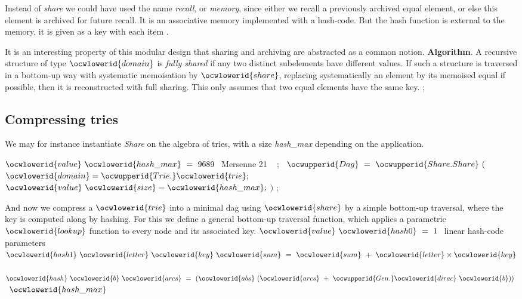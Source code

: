 \documentclass[12pt]{article}
\begin{document}
\ocwendcode{}\ocwindent{0.00em}
Instead of {\sl share} we could have used the name {\sl recall}, 
or {\sl memory}, since either we recall
a previously archived equal element, or else this element is archived for
future recall. It is an associative memory implemented with a hash-code. 
But the hash function is external to the memory, it is given as a key with 
each item . 

It is an interesting property of this modular design that
sharing and archiving are abstracted as a common notion. 
\ocweol
\ocwindent{0.00em}
{\bf Algorithm}.
   A recursive structure of type \ocwbegindcode{}$\ocwlowerid{domain}$\ocwenddcode{} is {\sl fully shared} if any two 
   distinct subelements have different values.
   If such a structure is traversed in a bottom-up way with systematic 
   memoisation by \ocwbegindcode{}$\ocwlowerid{share}$\ocwenddcode{}, replacing systematically an element by its memoised 
   equal if possible, then it is reconstructed with full sharing.
   This only assumes that two equal elements have the same key. 
\ocweol
\label{../ML/share.ml:4285}%
\medskip
\ocwbegincode{}\ocwindent{0.00em}
\ocweol
\ocwindent{0.00em}
;\ocweol
\ocweol
\ocwendcode{}\subsection{Compressing tries}

We may for instance instantiate {\sl Share} on the algebra of tries, with
a size {\sl hash\_max} depending on the application.


\label{../ML/mini.ml:0}%
\label{../ML/mini.ml:724}%
\ocwbegincode{}\ocwindent{0.00em}
$\ocwlowerid{value}~\ocwlowerid{hash\_max}~=~9689~$\ocwbc{} Mersenne 21 \ocwec{}~\ocweol
\ocwindent{0.00em}
;\ocweol
\ocwindent{0.00em}
~$\ocwupperid{Dag}~=~\ocwupperid{Share.Share}~($~~$\ocwlowerid{domain}=\ocwupperid{Trie.}\ocwlowerid{trie};~$\ocweol
\ocwindent{16.50em}
$\ocwlowerid{value}~\ocwlowerid{size}=\ocwlowerid{hash\_max};~$$)$\ocweol
\ocwindent{0.00em}
;\medskip

\ocwendcode{}\ocwindent{0.00em}
And now we compress a \ocwbegindcode{}$\ocwlowerid{trie}$\ocwenddcode{} into a minimal dag using \ocwbegindcode{}$\ocwlowerid{share}$\ocwenddcode{} by a simple 
bottom-up traversal, where the key is computed along by hashing.
For this we define a general bottom-up traversal function, which applies 
a parametric \ocwbegindcode{}$\ocwlowerid{lookup}$\ocwenddcode{} function to every node and its associated key. 
\ocweol
\label{../ML/mini.ml:1176}%
\medskip
\ocwbegincode{}\ocwindent{0.00em}
$\ocwlowerid{value}~\ocwlowerid{hash0}~=~1~$\ocwbc{} linear hash-code parameters \ocwec{}\ocweol
\ocwindent{0.00em}
~$\ocwlowerid{hash1}~\ocwlowerid{letter}~\ocwlowerid{key}~\ocwlowerid{sum}~=~\ocwlowerid{sum}~+~\ocwlowerid{letter}\times{}\ocwlowerid{key}$\ocweol
\ocwindent{0.00em}
~$\ocwlowerid{hash}~\ocwlowerid{b}~\ocwlowerid{arcs}~=~(\ocwlowerid{abs}~(\ocwlowerid{arcs}~+~\ocwupperid{Gen.}\ocwlowerid{dirac}~\ocwlowerid{b}))~$~$\ocwlowerid{hash\_max}$\medskip
\end{document}
